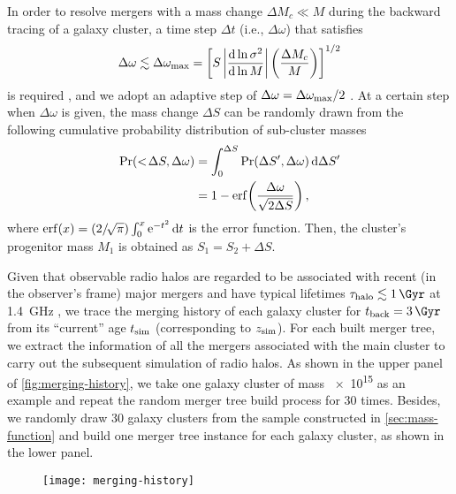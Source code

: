 In order to resolve mergers with a mass change $\Delta M_c \ll M$
during the backward tracing of a galaxy cluster, a time step $\Delta t$
(i.e., $\Delta\omega$) that satisfies
\begin{equation}
  \label{sec:dw-step}
  \Delta\omega \lesssim \Delta\omega_{\mathrm{max}} = \left[
    S \left| \frac{\mathrm{d}\ln \sigma^2}{\mathrm{d}\ln M} \right|
    \left( \frac{\Delta M_c}{M} \right) \right]^{1/2}
\end{equation}
is required \cite{lacey1993}, and we adopt an adaptive step of
$\Delta\omega = \Delta\omega_{\mathrm{max}} / 2$ \cite{randall2002}.
At a certain step when $\Delta\omega$ is given, the mass change
$\Delta S$ can be randomly drawn from the following cumulative
probability distribution of sub-cluster masses
\begin{align}
  \label{sec:cdf-sub-masses}
  \mathrm{Pr}(<\!\Delta S, \Delta\omega)
    & = \int_0^{\Delta S} \mathrm{Pr}(\Delta S', \Delta\omega) \,\mathrm{d}\Delta S' \\
    & = 1 - \operatorname{erf} \!\left( \frac{\Delta \omega}{\sqrt{2 \Delta S}} \right),
\end{align}
where
$\operatorname{erf}(x) = (2/\!\sqrt{\pi}) \int_0^x \mathrm{e}^{-t^2} \,\mathrm{d}t$
is the error function.
Then, the cluster's progenitor mass $M_1$ is obtained as
$S_1 = S_2 + \Delta S$.

Given that observable radio halos are regarded to be associated
with recent (in the observer's frame) major mergers
and have typical lifetimes $\tau_{\R{halo}} \lesssim \SI{1}{\Gyr}$
at \SI{1.4}{\GHz} \cite{brunetti2009,cassano2016},
we trace the merging history of each galaxy cluster for
$t_{\R{back}} = \SI{3}{\Gyr}$ from its \enquote{current}
age $t_{\mathrm{sim}}$ (corresponding to $z_{\mathrm{sim}}$).
For each built merger tree, we extract the information of all
the mergers associated with the main cluster to carry out the
subsequent simulation of radio halos.
As shown in the upper panel of \autoref{fig:merging-history},
we take one galaxy cluster of mass \SI{e15}{\solarmass} as an example and
repeat the random merger tree build process for 30 times.
Besides, we randomly draw 30 galaxy clusters from the sample constructed
in \autoref{sec:mass-function} and build one merger tree instance for each
galaxy cluster, as shown in the lower panel.

\begin{figure}[htp]
  \centering
  \texttt{[image: merging-history]}
  \label{fig:merging-history}
\end{figure}


